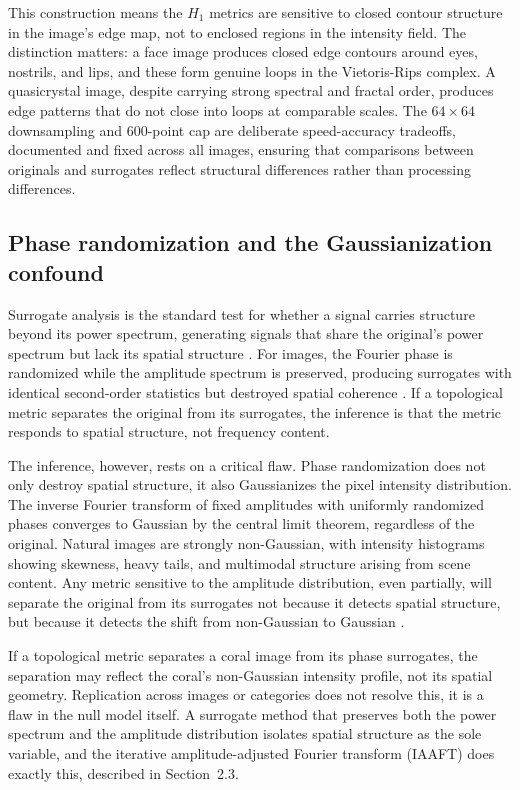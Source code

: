 \documentclass[a4paper,12pt]{article}
\begin{document}
This construction means the $H_1$ metrics are sensitive to closed contour structure in the image's edge map, not to enclosed regions in the intensity field. The distinction matters: a face image produces closed edge contours around eyes, nostrils, and lips, and these form genuine loops in the Vietoris-Rips complex. A quasicrystal image, despite carrying strong spectral and fractal order, produces edge patterns that do not close into loops at comparable scales. The $64 \times 64$ downsampling and 600-point cap are deliberate speed-accuracy tradeoffs, documented and fixed across all images, ensuring that comparisons between originals and surrogates reflect structural differences rather than processing differences.

\subsection{Phase randomization and the Gaussianization confound}

Surrogate analysis is the standard test for whether a signal carries structure beyond its power spectrum, generating signals that share the original's power spectrum but lack its spatial structure \citep{theiler1992}. For images, the Fourier phase is randomized while the amplitude spectrum is preserved, producing surrogates with identical second-order statistics but destroyed spatial coherence \citep{oppenheim1981}. If a topological metric separates the original from its surrogates, the inference is that the metric responds to spatial structure, not frequency content.

The inference, however, rests on a critical flaw. Phase randomization does not only destroy spatial structure, it also Gaussianizes the pixel intensity distribution. The inverse Fourier transform of fixed amplitudes with uniformly randomized phases converges to Gaussian by the central limit theorem, regardless of the original. Natural images are strongly non-Gaussian, with intensity histograms showing skewness, heavy tails, and multimodal structure arising from scene content. Any metric sensitive to the amplitude distribution, even partially, will separate the original from its surrogates not because it detects spatial structure, but because it detects the shift from non-Gaussian to Gaussian \citep{rapp1994}.

If a topological metric separates a coral image from its phase surrogates, the separation may reflect the coral's non-Gaussian intensity profile, not its spatial geometry. Replication across images or categories does not resolve this, it is a flaw in the null model itself. A surrogate method that preserves both the power spectrum and the amplitude distribution isolates spatial structure as the sole variable, and the iterative amplitude-adjusted Fourier transform (IAAFT) does exactly this, described in Section~2.3.
\end{document}
